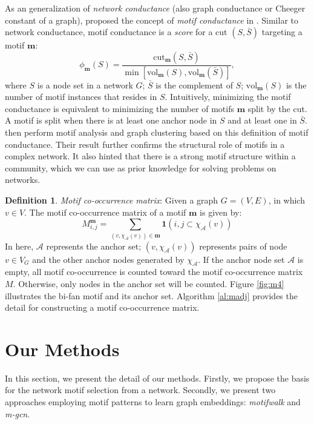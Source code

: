 \documentclass{article}
\theoremstyle{definition}
\newtheorem{definition}{Definition}[section]
\begin{document}
As an generalization of \emph{network conductance} (also graph conductance
or Cheeger constant of a graph), \citeauthor{juremotif} proposed
the concept of \emph{motif conductance} in \cite{juremotif}. Similar to
network conductance, motif conductance is a \emph{score} for a cut
$(S, \bar{S})$ targeting a motif $\mathbf{m}$:
\begin{equation*}
	\phi_{\mathbf{m}}(S) = \frac{\mbox{cut}_{\mathbf{m}}(S,\bar{S})}{\min[\mbox{vol}_{\mathbf{m}}(S), \mbox{vol}_{\mathbf{m}}(\bar{S})]},
\end{equation*}
where $S$ is a node set in a network $G$; $\bar{S}$ is the complement
of $S$; $\mbox{vol}_{\mathbf{m}}(S)$ is the number of motif instances
that resides in $S$. Intuitively, minimizing the motif conductance is
equivalent to minimizing the number of motifs $\mathbf{m}$ split
by the cut. A motif is split when there is at least one
anchor node in $S$ and at least one in $\bar{S}$. \citeauthor{juremotif}
then perform motif analysis and graph clustering based on this
definition of motif conductance. Their result further confirms the
structural role of motifs in a complex network. It also hinted that there
is a strong motif structure within a community, which we can use as
prior knowledge for solving problems on networks.

\begin{definition} \emph{Motif co-occurrence matrix}:
Given a graph $G = (V,E)$, in which $v \in V$. The motif co-occurrence
matrix of a motif $\mathbf{m}$ is given by:
$$M_{i,j}^{\mathbf{m}} = \sum_{(v, \chi_{\mathcal{A}}(v)) \in \mathbf{m}} \mathbf{1}({i,j} \subset \chi_\mathcal{A}(v))$$
In here, $\mathcal{A}$ represents the anchor set;
$(v, \chi_{\mathcal{A}}(v))$ represents pairs of node $v \in V_G$ and the
other anchor nodes generated by $\chi_\mathcal{A}$. If the anchor node set
$\mathcal{A}$ is empty, all motif co-occurrence is counted toward the
motif co-occurrence matrix $M$. Otherwise, only nodes in the anchor set
will be counted. Figure \ref{fig:m4} illustrates the bi-fan motif and
its anchor set. Algorithm \ref{al:madj} provides the detail for constructing
a motif co-occurrence matrix.
\end{definition}

\section{Our Methods}

In this section, we present the detail of our methods. Firstly,
we propose the basis for the network motif selection from a network.
Secondly, we present two approaches employing motif patterns to
learn graph embeddings: \emph{motifwalk} and \emph{m-gcn}.
\end{document}
